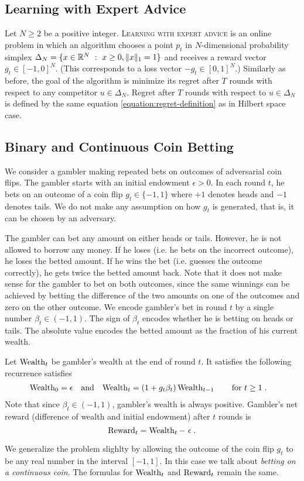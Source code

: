 \subsection{Learning with Expert Advice}

Let $N \ge 2$ be a positive integer. \textsc{Learning with expert advice} is an
online problem in which an algorithm chooses a point $p_t$ in $N$-dimensional
probability simplex $\Delta_N = \{ x \in \mathbb{R}^N ~:~ x \ge 0, \|x\|_1 = 1 \}$ and
receives a reward vector $g_t \in [-1,0]^N$. (This corresponds to a loss vector
$-g_t \in [0,1]^N$.) Similarly as before, the goal of the algorithm is minimize
its regret after $T$ rounds with respect to any competitor $u \in \Delta_N$.
Regret after $T$ rounds with respect to $u \in \Delta_N$ is defined by the same
equation \eqref{equation:regret-definition} as in Hilbert space case.


\subsection{Binary and Continuous Coin Betting}

We consider a gambler making repeated bets on outcomes of adversarial coin
flips. The gambler starts with an initial endowment $\epsilon > 0$. In each
round $t$, he bets on an outcome of a coin flip $g_t \in \{-1,1\}$ where $+1$
denotes heads and $-1$ denotes tails. We do not make any assumption on how $g_t$
is generated, that is, it can be chosen by an adversary.

The gambler can bet any amount on either heads or tails. However, he is not
allowed to borrow any money. If he loses (i.e. he bets on the incorrect
outcome), he loses the betted amount. If he wins the bet (i.e. guesses the
outcome correctly), he gets twice the betted amount back.  Note that it does not
make sense for the gambler to bet on both outcomes, since the same winnings can
be achieved by betting the difference of the two amounts on one of the outcomes
and zero on the other outcome. We encode gambler's bet in round $t$ by a single
number $\beta_t \in (-1,1)$. The sign of $\beta_t$ encodes whether he is betting
on heads or tails. The absolute value encodes the betted amount as the fraction
of his current wealth.

Let $\operatorname{Wealth}_t$ be gambler's wealth at the end of round $t$. It satisfies the
following recurrence satisfies
\begin{align*}
\operatorname{Wealth}_0 & = \epsilon &
& \text{and} &
\operatorname{Wealth}_t & = (1 + g_t \beta_t) \operatorname{Wealth}_{t-1} \qquad \text{for $t \ge 1$} \; .
\end{align*}
Note that since $\beta_t \in (-1,1)$, gambler's wealth is always positive.
Gambler's net reward (difference of wealth and initial endowment) after $t$
rounds is
$$
\Reward_t = \Wealth_t - \ \epsilon \; .
$$

We generalize the problem slighlty by allowing the outcome of the coin flip
$g_t$ to be any real number in the interval $[-1,1]$. In this case we talk about
\emph{betting on a continuous coin}. The formulas for $\operatorname{Wealth}_t$ and
$\operatorname{Reward}_t$ remain the same.
